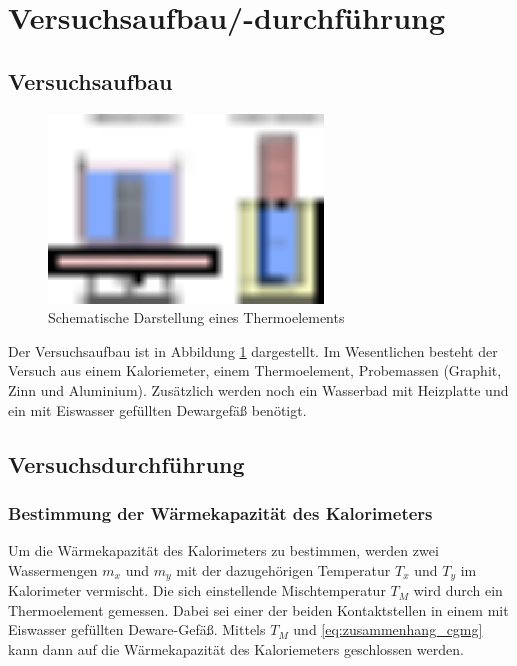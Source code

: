 \section{Versuchsaufbau/-durchführung}

\subsection{Versuchsaufbau}
\begin{figure}
  \centering
  \includegraphics[width=0.65\textwidth]{bilder/versuchsaufbau_dulon_peptip.pdf}
  \caption{Schematische Darstellung eines Thermoelements}
  \label{fig:aufbau}
\end{figure}
Der Versuchsaufbau ist in Abbildung \ref{fig:aufbau} dargestellt.
Im Wesentlichen besteht der Versuch aus einem Kaloriemeter, einem Thermoelement, %
Probemassen (Graphit, Zinn und Aluminium). %
Zusätzlich werden noch ein Wasserbad mit Heizplatte und
ein mit Eiswasser gefüllten Dewargefäß benötigt.

\subsection{Versuchsdurchführung}

\subsubsection{Bestimmung der Wärmekapazität des Kalorimeters}
Um die Wärmekapazität des Kalorimeters zu bestimmen, werden
zwei Wassermengen $m_x$ und $m_y$ mit der dazugehörigen Temperatur $T_x$ und $T_y$
im Kalorimeter vermischt.
Die sich einstellende Mischtemperatur $T_M$ wird durch ein Thermoelement gemessen.
Dabei sei einer der beiden Kontaktstellen %
in einem mit Eiswasser gefüllten Deware-Gefäß.
Mittels $T_M$ und \eqref{eq:zusammenhang_cgmg} kann dann auf die Wärmekapazität des
Kaloriemeters geschlossen werden. %

